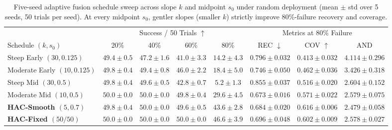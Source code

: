 \documentclass[11pt]{article}
\theoremstyle{plain}
\theoremstyle{definition}
\theoremstyle{remark}
\begin{document}
\begin{table}[t]
\centering
\caption{Five-seed adaptive fusion schedule sweep across slope $k$ and midpoint $s_0$ under random deployment (mean $\pm$ std over 5 seeds, 50 trials per seed). At every midpoint $s_0$, gentler slopes (smaller $k$) strictly improve $80\%$-failure recovery and coverage.}
\label{tab:schedule-sweep}
\scriptsize
\setlength{\tabcolsep}{3.2pt}
\begin{tabular}{@{}lccccccc@{}}
\toprule
 & \multicolumn{4}{c}{Success / 50 Trials $\uparrow$} & \multicolumn{3}{c}{Metrics at $80\%$ Failure} \\
\cmidrule(lr){2-5}\cmidrule(lr){6-8}
Schedule $(k, s_0)$ & 20\% & 40\% & 60\% & 80\% & REC $\downarrow$ & COV $\uparrow$ & AND \\
\midrule
Steep Early $(30, 0.125)$    & $49.4\pm0.5$ & $47.2\pm1.6$ & $41.0\pm3.3$ & $14.2\pm4.3$ & $0.796\pm0.032$ & $0.413\pm0.032$ & $4.114\pm0.296$ \\
Moderate Early $(10, 0.125)$ & $49.8\pm0.4$ & $49.4\pm0.8$ & $46.0\pm2.2$ & $18.4\pm5.0$ & $0.746\pm0.050$ & $0.462\pm0.036$ & $3.426\pm0.318$ \\
Steep Mid $(30, 0.5)$        & $49.8\pm0.4$ & $49.6\pm0.5$ & $42.8\pm0.7$ & $5.2\pm1.3$  & $0.855\pm0.037$ & $0.516\pm0.020$ & $2.604\pm0.152$ \\
Moderate Mid $(10, 0.5)$     & $50.0\pm0.0$ & $50.0\pm0.0$ & $49.8\pm0.4$ & $29.6\pm4.5$ & $\mathbf{0.673\pm0.016}$ & $0.571\pm0.022$ & $2.579\pm0.075$ \\
\textbf{HAC-Smooth $(5, 0.7)$} & $49.8\pm0.4$ & $50.0\pm0.0$ & $49.6\pm0.5$ & $43.6\pm2.8$ & $0.684\pm0.020$ & $\mathbf{0.616\pm0.006}$ & $\mathbf{2.479\pm0.058}$ \\
\textbf{HAC-Fixed $(50/50)$} & $\mathbf{50.0\pm0.0}$ & $\mathbf{50.0\pm0.0}$ & $\mathbf{50.0\pm0.0}$ & $\mathbf{46.6\pm3.9}$ & $0.696\pm0.048$ & $0.602\pm0.009$ & $2.578\pm0.027$ \\
\bottomrule
\end{tabular}
\end{table}
\end{document}
